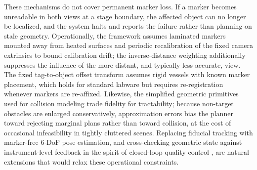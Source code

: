 \documentclass{ieeeaccess}
\begin{document}
These mechanisms do not cover permanent marker loss. If a marker becomes unreadable in both views at a stage boundary, the affected object can no longer be localized, and the system halts and reports the failure rather than planning on stale geometry. Operationally, the framework assumes laminated markers mounted away from heated surfaces and periodic recalibration of the fixed camera extrinsics to bound calibration drift; the inverse-distance weighting additionally suppresses the influence of the more distant, and typically less accurate, view. The fixed tag-to-object offset transform assumes rigid vessels with known marker placement, which holds for standard labware but requires re-registration whenever markers are re-affixed. Likewise, the simplified geometric primitives used for collision modeling trade fidelity for tractability; because non-target obstacles are enlarged conservatively, approximation errors bias the planner toward rejecting marginal plans rather than toward collision, at the cost of occasional infeasibility in tightly cluttered scenes. Replacing fiducial tracking with marker-free 6-DoF pose estimation, and cross-checking geometric state against instrument-level feedback in the spirit of closed-loop quality control \cite{khan2025real}, are natural extensions that would relax these operational constraints.
\end{document}
